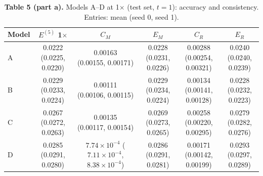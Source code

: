 \begin{table}[H]
\centering\small
\begin{adjustbox}{max width=\textwidth}
\begin{tabular}{@{}lccccc@{}}
\toprule
\textbf{Model} & \textbf{$E^{(5)}$ 1$\times$} & \textbf{$C_M$} & \textbf{$E_M$} & \textbf{$C_R$} & \textbf{$E_R$} \\
\midrule
A & \makecell{0.0222\\[-1pt]{\tiny(0.0225, 0.0220)}} & \makecell{0.00163\\[-1pt]{\tiny(0.00155, 0.00171)}} & \makecell{0.0228\\[-1pt]{\tiny(0.0231, 0.0226)}} & \makecell{0.00288\\[-1pt]{\tiny(0.00254, 0.00321)}} & \makecell{0.0240\\[-1pt]{\tiny(0.0240, 0.0239)}} \\
B & \makecell{0.0229\\[-1pt]{\tiny(0.0233, 0.0224)}} & \makecell{0.00111\\[-1pt]{\tiny(0.00106, 0.00115)}} & \makecell{0.0229\\[-1pt]{\tiny(0.0234, 0.0224)}} & \makecell{0.00134\\[-1pt]{\tiny(0.00141, 0.00128)}} & \makecell{0.0228\\[-1pt]{\tiny(0.0232, 0.0223)}} \\
C & \makecell{0.0267\\[-1pt]{\tiny(0.0272, 0.0263)}} & \makecell{0.00135\\[-1pt]{\tiny(0.00117, 0.00154)}} & \makecell{0.0269\\[-1pt]{\tiny(0.0273, 0.0265)}} & \makecell{0.00258\\[-1pt]{\tiny(0.00220, 0.00295)}} & \makecell{0.0279\\[-1pt]{\tiny(0.0282, 0.0276)}} \\
D & \makecell{0.0285\\[-1pt]{\tiny(0.0291, 0.0280)}} & \makecell{$7.74\times10^{-4}$\\[-1pt]{\tiny($7.11\times10^{-4}$, $8.38\times10^{-4}$)}} & \makecell{0.0286\\[-1pt]{\tiny(0.0291, 0.0281)}} & \makecell{0.00171\\[-1pt]{\tiny(0.00142, 0.00199)}} & \makecell{0.0293\\[-1pt]{\tiny(0.0297, 0.0289)}} \\
\bottomrule
\end{tabular}
\end{adjustbox}
\caption*{\textbf{Table 5 (part a).} Models A--D at 1$\times$ (test set, $t=1$): accuracy and consistency. Entries: mean (seed 0, seed 1).}
\end{table}

